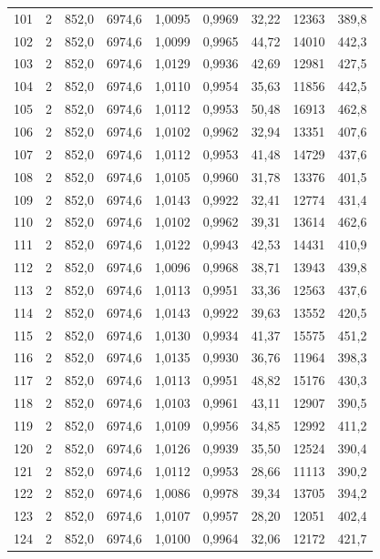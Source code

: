\documentclass[11pt,a4paper]{article}
\begin{document}
{\begin{longtable}{r c r r r r r r r}
101 & 2 & 852,0 & 6974,6 & 1,0095 & 0,9969 & 32,22 & 12363 & 389,8 \\
102 & 2 & 852,0 & 6974,6 & 1,0099 & 0,9965 & 44,72 & 14010 & 442,3 \\
103 & 2 & 852,0 & 6974,6 & 1,0129 & 0,9936 & 42,69 & 12981 & 427,5 \\
104 & 2 & 852,0 & 6974,6 & 1,0110 & 0,9954 & 35,63 & 11856 & 442,5 \\
105 & 2 & 852,0 & 6974,6 & 1,0112 & 0,9953 & 50,48 & 16913 & 462,8 \\
106 & 2 & 852,0 & 6974,6 & 1,0102 & 0,9962 & 32,94 & 13351 & 407,6 \\
107 & 2 & 852,0 & 6974,6 & 1,0112 & 0,9953 & 41,48 & 14729 & 437,6 \\
108 & 2 & 852,0 & 6974,6 & 1,0105 & 0,9960 & 31,78 & 13376 & 401,5 \\
109 & 2 & 852,0 & 6974,6 & 1,0143 & 0,9922 & 32,41 & 12774 & 431,4 \\
110 & 2 & 852,0 & 6974,6 & 1,0102 & 0,9962 & 39,31 & 13614 & 462,6 \\
111 & 2 & 852,0 & 6974,6 & 1,0122 & 0,9943 & 42,53 & 14431 & 410,9 \\
112 & 2 & 852,0 & 6974,6 & 1,0096 & 0,9968 & 38,71 & 13943 & 439,8 \\
113 & 2 & 852,0 & 6974,6 & 1,0113 & 0,9951 & 33,36 & 12563 & 437,6 \\
114 & 2 & 852,0 & 6974,6 & 1,0143 & 0,9922 & 39,63 & 13552 & 420,5 \\
115 & 2 & 852,0 & 6974,6 & 1,0130 & 0,9934 & 41,37 & 15575 & 451,2 \\
116 & 2 & 852,0 & 6974,6 & 1,0135 & 0,9930 & 36,76 & 11964 & 398,3 \\
117 & 2 & 852,0 & 6974,6 & 1,0113 & 0,9951 & 48,82 & 15176 & 430,3 \\
118 & 2 & 852,0 & 6974,6 & 1,0103 & 0,9961 & 43,11 & 12907 & 390,5 \\
119 & 2 & 852,0 & 6974,6 & 1,0109 & 0,9956 & 34,85 & 12992 & 411,2 \\
120 & 2 & 852,0 & 6974,6 & 1,0126 & 0,9939 & 35,50 & 12524 & 390,4 \\
121 & 2 & 852,0 & 6974,6 & 1,0112 & 0,9953 & 28,66 & 11113 & 390,2 \\
122 & 2 & 852,0 & 6974,6 & 1,0086 & 0,9978 & 39,34 & 13705 & 394,2 \\
123 & 2 & 852,0 & 6974,6 & 1,0107 & 0,9957 & 28,20 & 12051 & 402,4 \\
124 & 2 & 852,0 & 6974,6 & 1,0100 & 0,9964 & 32,06 & 12172 & 421,7 \\

\end{longtable}}
\end{document}
